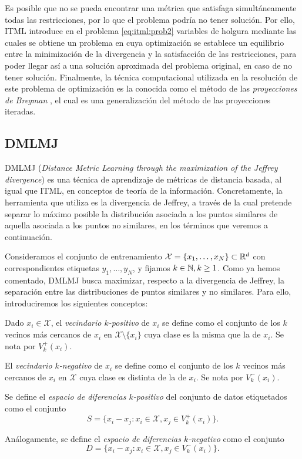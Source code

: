 Es posible que no se pueda encontrar una métrica que satisfaga simultáneamente todas las restricciones, por lo que el problema podría no tener solución. Por ello, ITML introduce en el problema \ref{eq:itml:prob2} variables de holgura mediante las cuales se obtiene un problema en cuya optimización se establece un equilibrio entre la minimización de la divergencia y la satisfacción de las restricciones, para poder llegar así a una solución aproximada del problema original, en caso de no tener solución. Finalmente, la técnica computacional utilizada en la resolución de este problema de optimización es la conocida como el método de las \emph{proyecciones de Bregman} \cite{bregman_projections}, el cual es una generalización del método de las proyecciones iteradas.

\subsection{DMLMJ}

DMLMJ (\emph{Distance Metric Learning through the maximization of the Jeffrey divergence}) \cite{dmlmj} es una técnica de aprendizaje de métricas de distancia basada, al igual que ITML, en conceptos de teoría de la información. Concretamente, la herramienta que utiliza es la divergencia de Jeffrey, a través de la cual pretende separar lo máximo posible la distribución asociada a los puntos similares de aquella asociada a los puntos no similares, en los términos que veremos a continuación.

Consideramos el conjunto de entrenamiento $\mathcal{X} = \{x_1,\dots,x_N\} \subset \mathbb{R}^d$ con correspondientes etiquetas $y_1,\dots,y_N$, y fijamos $k \in \mathbb{N}, k \ge 1$. Como ya hemos comentado, DMLMJ busca maximizar, respecto a la divergencia de Jeffrey, la separación entre las distribuciones de puntos similares y no similares. Para ello, introduciremos los siguientes conceptos:

\begin{definition}
    Dado $x_i \in \mathcal{X}$, el \emph{vecindario $k$-positivo} de $x_i$ se define como el conjunto de los $k$ vecinos más cercanos de $x_i$ en $\mathcal{X} \setminus \{x_i\}$ cuya clase es la misma que la de $x_i$. Se nota por $V_k^+(x_i)$.

    El \emph{vecindario $k$-negativo} de $x_i$ se define como el conjunto de los $k$ vecinos más cercanos de $x_i$ en $\mathcal{X}$ cuya clase es distinta de la de $x_i$. Se nota por $V_k^-(x_i)$.

    Se define el \emph{espacio de diferencias $k$-positivo} del conjunto de datos etiquetados como el conjunto 
    \[ S = \{x_i - x_j \colon x_i \in \mathcal{X}, x_j \in V_k^+(x_i)\}. \]

    Análogamente, se define el \emph{espacio de diferencias $k$-negativo} como el conjunto
    \[ D = \{x_i - x_j \colon x_i \in \mathcal{X}, x_j \in V_k^-(x_i)\}. \]

\end{definition}

